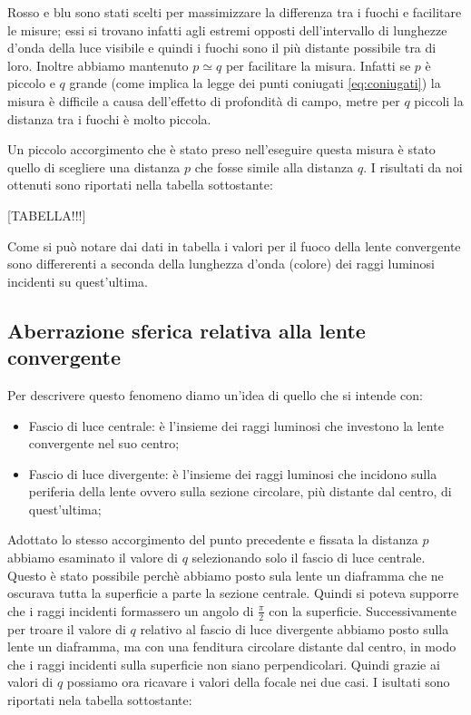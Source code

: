 Rosso e blu sono stati scelti per massimizzare la differenza tra i fuochi e facilitare le misure; essi si trovano infatti agli estremi opposti dell'intervallo di lunghezze d'onda della luce visibile e quindi i fuochi sono il più distante possibile tra di loro. Inoltre abbiamo mantenuto $p \simeq q$ per facilitare la misura. Infatti se $p$ è piccolo e $q$ grande (come implica la legge dei punti coniugati \ref{eq:coniugati}) la misura è difficile a causa dell'effetto di profondità di campo, metre per $q$ piccoli la distanza tra i fuochi è molto piccola.

Un piccolo accorgimento che è stato preso nell'eseguire questa misura è stato quello di scegliere una distanza $p$ che fosse simile alla distanza $q$.
I risultati da noi ottenuti sono riportati nella tabella sottostante:

[TABELLA!!!]

Come si può notare dai dati in tabella i valori per il fuoco della lente convergente sono differerenti a seconda della lunghezza d'onda (colore) dei raggi luminosi incidenti su quest'ultima. 

\subsection{Aberrazione sferica relativa alla lente convergente}

Per descrivere questo fenomeno diamo un'idea di quello che si intende con:
\begin{itemize}
	\item{Fascio di luce centrale: è l'insieme dei raggi luminosi che investono la lente convergente nel suo centro;}
	\item{Fascio di luce divergente: è l'insieme dei raggi luminosi che incidono sulla periferia della lente ovvero sulla sezione circolare, più distante dal centro, di quest'ultima;}
\end{itemize}
Adottato lo stesso accorgimento del punto precedente e fissata la distanza $p$ abbiamo esaminato il valore di $q$ selezionando solo il fascio di luce centrale. Questo è stato possibile perchè abbiamo posto sula lente un diaframma che ne oscurava tutta la superficie a parte la sezione centrale. Quindi si poteva supporre che i raggi incidenti formassero un angolo di $\frac{\pi}{2}$ con la superficie.
Successivamente per troare il valore di $q$ relativo al fascio di luce divergente abbiamo posto sulla lente un diaframma, ma con una fenditura circolare distante dal centro, in modo che i raggi incidenti sulla superficie non siano perpendicolari.
Quindi grazie ai valori di $q$ possiamo ora ricavare i valori della focale nei due casi. I isultati sono riportati nela tabella sottostante:


